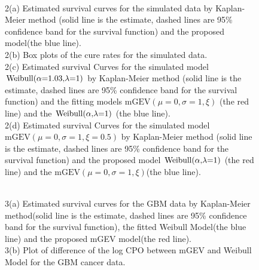 \documentclass[smallextended]{svjour3}       %
\begin{document}
{\begin{figure}[!p]
{}
\caption{\\2(a) Estimated survival curves for the simulated data by Kaplan-Meier method (solid
line is the estimate, dashed lines are 95\% confidence band for the
survival function) and the proposed model(the blue line).\\ 2(b) Box plots of the cure rates for the simulated data.\\ 2(c) Estimated survival Curves for the simulated model $\mbox{Weibull(\ensuremath{\alpha}=1.03,\ensuremath{\lambda}=1)}$ by Kaplan-Meier method (solid line is the estimate, dashed lines are 95\% confidence band for the survival function) and the fitting models $\mbox{mGEV}(\mu=0,\sigma=1,\xi)$ (the red line) and the $\mbox{Weibull(\ensuremath{\alpha},\ensuremath{\lambda}=1)}$ (the blue line).\\ 2(d) Estimated survival Curves for the simulated model $\mbox{mGEV}(\mu=0,\sigma=1,\xi=0.5)$ by Kaplan-Meier method (solid line is the estimate, dashed lines are 95\% confidence band for the survival function) and the proposed model $\mbox{Weibull(\ensuremath{\alpha},\ensuremath{\lambda}=1)}$ (the red line) and the $\mbox{mGEV}(\mu=0,\sigma=1,\xi)$(the blue line).}
\label{fig:test}
\end{figure}

\begin{figure}[!p]
\centering
{}
\caption{\\3(a) Estimated survival curves for the GBM data by Kaplan-Meier method(solid
line is the estimate, dashed lines are 95\% confidence band for the
survival function), the fitted Weibull Model(the blue line) and the proposed mGEV model(the red line).\\ 3(b) Plot of difference of the log CPO between mGEV and Weibull Model for the GBM cancer data.}
\label{fig:test}
\end{figure}

}
\end{document}
